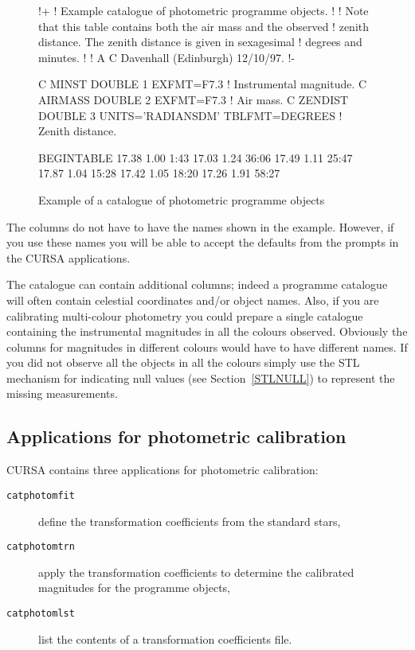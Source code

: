 \documentclass[twoside,11pt]{starlink}
\begin{document}
\begin{figure}[htbp]

\begin{terminalv}
!+
! Example catalogue of photometric programme objects.
!
! Note that this table contains both the air mass and the observed
! zenith distance.  The zenith distance is given in sexagesimal
! degrees and minutes.
!
! A C Davenhall (Edinburgh) 12/10/97.
!-

C MINST   DOUBLE  1 EXFMT=F7.3    ! Instrumental magnitude.
C AIRMASS DOUBLE  2 EXFMT=F7.3    ! Air mass.
C ZENDIST DOUBLE  3 UNITS='RADIANS{DM}' TBLFMT=DEGREES ! Zenith distance.

BEGINTABLE
 17.38  1.00   1:43
 17.03  1.24  36:06
 17.49  1.11  25:47
 17.87  1.04  15:28
 17.42  1.05  18:20
 17.26  1.91  58:27
\end{terminalv}

\caption{Example of a catalogue of photometric programme objects
\label{PHOTOPRGCAT} }

\end{figure}

The columns do not have to have the names shown in the example.
However, if you use these names you will be able to accept the defaults
from the prompts in the CURSA applications.

The catalogue can contain additional columns; indeed a programme catalogue
will often contain celestial coordinates and/or object names.  Also, if
you are calibrating multi-colour photometry you could prepare a single
catalogue containing the instrumental magnitudes in all the colours
observed.  Obviously the columns for magnitudes in different colours
would have to have different names.  If you did not observe all the
objects in all the colours simply use the STL mechanism for indicating
null values (see Section~\ref{STLNULL}) to represent the missing
measurements.

\subsection{Applications for photometric calibration}

CURSA contains three applications for photometric calibration:

\begin{description}

  \item[\texttt{catphotomfit}] define the transformation coefficients from
   the standard stars,

  \item[\texttt{catphotomtrn}] apply the transformation coefficients to
   determine the calibrated magnitudes for the programme objects,

  \item[\texttt{catphotomlst}] list the contents of a transformation
   coefficients file.

\end{description}
\end{document}
